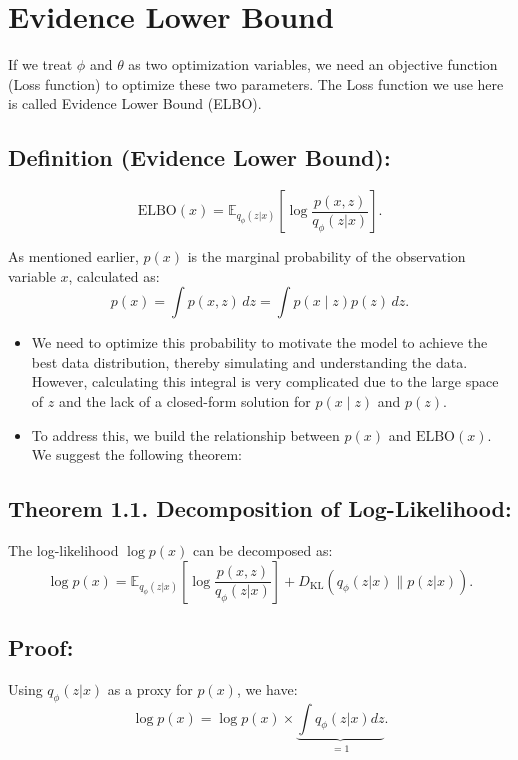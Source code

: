 \section{Evidence Lower Bound}

If we treat ${\phi}$ and ${\theta}$ as two optimization variables, we need an objective function (Loss function) to optimize these two parameters. The Loss function we use here is called Evidence Lower Bound (ELBO).

\subsection*{Definition (Evidence Lower Bound):}
\begin{equation}
\text{ELBO}(x) = \mathbb{E}_{q_\phi(z|x)} \left[ \log \frac{p(x, z)}{q_\phi(z|x)} \right].
\end{equation}

As mentioned earlier, \(p(x)\) is the marginal probability of the observation variable \(x\), calculated as:
\[
p(x) = \int p(x, z) \, dz = \int p(x \mid z) p(z) \, dz.
\]

\begin{itemize}
    \item We need to optimize this probability to motivate the model to achieve the best data distribution, thereby simulating and understanding the data. However, calculating this integral is very complicated due to the large space of \(z\) and the lack of a closed-form solution for \(p(x \mid z)\) and \(p(z)\).
    \item To address this, we build the relationship between \(p(x)\) and \(\text{ELBO}(x)\). We suggest the following theorem:
\end{itemize}

\subsection*{Theorem 1.1. Decomposition of Log-Likelihood:}
The log-likelihood \(\log p(x)\) can be decomposed as:
\[
\log p(x) = \mathbb{E}_{q_\phi(z|x)} \left[ \log \frac{p(x, z)}{q_\phi(z|x)} \right] + D_{\mathrm{KL}}(q_\phi(z|x) \| p(z|x)).
\]

\subsection*{Proof:}
Using \(q_\phi(z|x)\) as a proxy for \(p(x)\), we have:
\[
\log p(x) = \log p(x) \times \underbrace{\int q_\phi(z|x) dz}_{=1}.
\]

